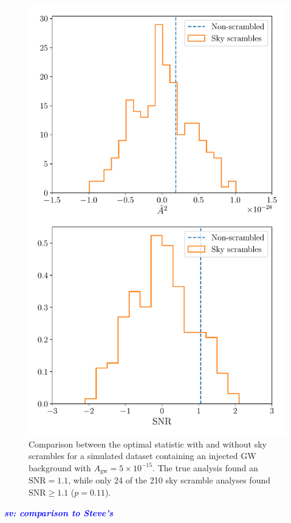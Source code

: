 \documentclass[twocolumn,aps,prd,superscriptaddress]{revtex4-1}
\newcommand{\sv}[1]{\textcolor{blue}{\it{\textbf{sv: #1}}} }
\newcommand{\Agw}{\ensuremath{A_\mathrm{gw}}}
\begin{document}
\begin{figure}[ht]
	\includegraphics[width=\columnwidth]{plots/skyscrambles_dataset50.pdf}
	\caption{Comparison between the optimal statistic with and without sky scrambles 
			for a simulated dataset containing an injected GW background with $\Agw = 5\times10^{-15}$. 
			The true analysis found an $\mathrm{SNR} = 1.1$, while only 24 of the 210 sky scramble analyses 
			found $\mathrm{SNR} \geq 1.1$ ($p=0.11$).}
	\label{fig:skyscrambles_dataset_sample}
\end{figure}

\sv{comparison to Steve's}
\end{document}
